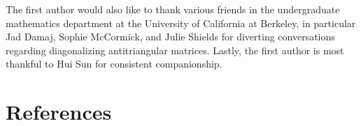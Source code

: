 \documentclass{amsart}
\begin{document}
The first author would also like to thank various friends in the undergraduate mathematics department at the University of California at Berkeley, in particular Jad Damaj, Sophie McCormick, and Julie Shields for diverting conversations regarding diagonalizing antitriangular matrices. Lastly, the first author is most thankful to Hui Sun for consistent companionship.







\section*{References}
\printbibliography[heading=none]
\end{document}
